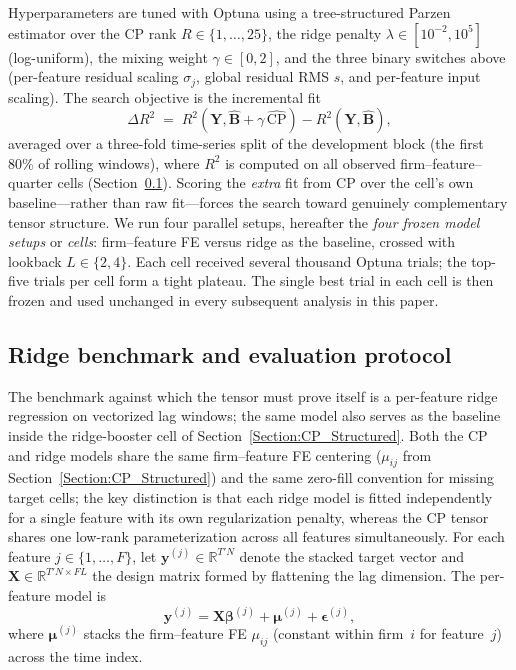 \documentclass[pdflatex,sn-mathphys-num]{sn-jnl}%
\theoremstyle{thmstyleone}%
\theoremstyle{thmstyletwo}%
\theoremstyle{thmstylethree}%
\begin{document}
Hyperparameters are tuned with Optuna \citep{akiba2019optuna} using a tree-structured Parzen estimator over the CP rank $R \in \{1, \ldots, 25\}$, the ridge penalty $\lambda \in [10^{-2}, 10^{5}]$ (log-uniform), the mixing weight $\gamma \in [0, 2]$, and the three binary switches above (per-feature residual scaling $\sigma_j$, global residual RMS $s$, and per-feature input scaling). The search objective is the incremental fit
\begin{equation}
\Delta R^2 \;=\; R^2\!\left(\mathbf{Y}, \widehat{\mathbf{B}} + \gamma\, \widehat{\mathrm{CP}}\right) - R^2\!\left(\mathbf{Y}, \widehat{\mathbf{B}}\right),
\end{equation}
averaged over a three-fold time-series split of the development block (the first 80\% of rolling windows), where $R^2$ is computed on all observed firm--feature--quarter cells (Section~\ref{Section:Baseline_Eval}). Scoring the \emph{extra} fit from CP over the cell's own baseline---rather than raw fit---forces the search toward genuinely complementary tensor structure. We run four parallel setups, hereafter the \emph{four frozen model setups} or \emph{cells}: firm--feature FE versus ridge as the baseline, crossed with lookback $L \in \{2,4\}$. Each cell received several thousand Optuna trials; the top-five trials per cell form a tight plateau. The single best trial in each cell is then frozen and used unchanged in every subsequent analysis in this paper.

\subsection{Ridge benchmark and evaluation protocol}
\label{Section:Baseline_Eval}

The benchmark against which the tensor must prove itself is a per-feature ridge regression on vectorized lag windows; the same model also serves as the baseline inside the ridge-booster cell of Section~\ref{Section:CP_Structured}. Both the CP and ridge models share the same firm--feature FE centering ($\mu_{ij}$ from Section~\ref{Section:CP_Structured}) and the same zero-fill convention for missing target cells; the key distinction is that each ridge model is fitted independently for a single feature with its own regularization penalty, whereas the CP tensor shares one low-rank parameterization across all features simultaneously. For each feature $j \in \{1, \ldots, F\}$, let $\mathbf{y}^{(j)} \in \mathbb{R}^{T' N}$ denote the stacked target vector and $\mathbf{X} \in \mathbb{R}^{T' N \times FL}$ the design matrix formed by flattening the lag dimension. The per-feature model is
\begin{equation}
\mathbf{y}^{(j)} = \mathbf{X} \boldsymbol{\beta}^{(j)} + \boldsymbol{\mu}^{(j)} + \boldsymbol{\epsilon}^{(j)},
\end{equation}
where $\boldsymbol{\mu}^{(j)}$ stacks the firm--feature FE $\mu_{ij}$ (constant within firm~$i$ for feature~$j$) across the time index.
\end{document}
